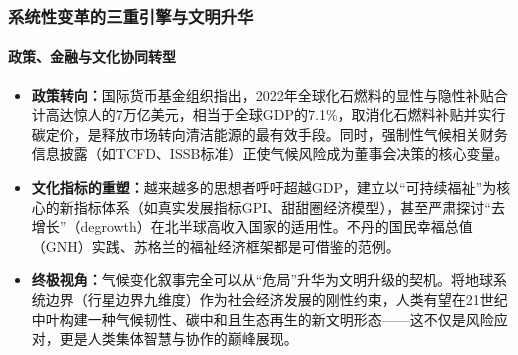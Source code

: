 \documentclass[11pt]{beamer}
\begin{document}
\begin{frame}
\frametitle{系统性变革的三重引擎与文明升华}
\framesubtitle{政策、金融与文化协同转型}
\begin{itemize}
    \item \textbf{政策转向：}国际货币基金组织指出，2022年全球化石燃料的显性与隐性补贴合计高达\alert{惊人的7万亿美元}，相当于全球GDP的7.1\%，取消化石燃料补贴并实行碳定价，是释放市场转向清洁能源的最有效手段。同时，强制性\alert{气候相关财务信息披露（如TCFD、ISSB标准）}正使气候风险成为董事会决策的核心变量。
    \item \textbf{文化指标的重塑：}越来越多的思想者呼吁超越GDP，建立以“可持续福祉”为核心的新指标体系（如\alert{真实发展指标GPI、甜甜圈经济模型}），甚至严肃探讨“去增长”（degrowth）在北半球高收入国家的适用性。不丹的国民幸福总值（GNH）实践、苏格兰的福祉经济框架都是可借鉴的范例。
    \item \textbf{终极视角：}气候变化叙事完全可以从“危局”升华为\alert{文明升级的契机}。将\alert{地球系统边界（行星边界九维度）}作为社会经济发展的刚性约束，人类有望在21世纪中叶构建一种\alert{气候韧性、碳中和且生态再生的新文明形态}——这不仅是风险应对，更是人类集体智慧与协作的巅峰展现。
\end{itemize}
\end{frame}
\end{document}
